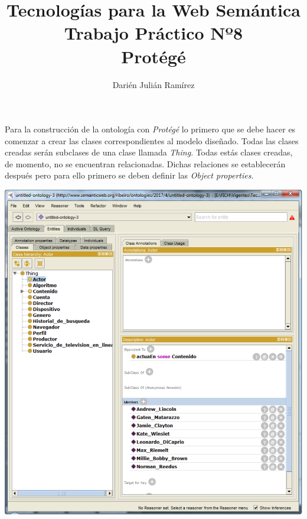 \documentclass[a4paper,10pt,spanish,oneside]{article}
\title{\Huge\usefont{T1}{}{}{n} Tecnologías para la Web Semántica\\
									 Trabajo Práctico Nº8\\
									 Protégé}
\author{Darién Julián Ramírez}
\date{}
\begin{document}
\maketitle %

\begin{minipage}{0.3\linewidth}

Para la construcción de la ontología con \textit{Protégé} lo primero que se debe hacer es comenzar a crear las clases correspondientes al modelo diseñado. Todas las clases creadas serán subclases de una clase llamada \textit{Thing}. Todas estás clases creadas, de momento, no se encuentran relacionadas. Dichas relaciones se establecerán después pero para ello primero se deben definir las \textit{Object properties}.

\end{minipage} \hfill \begin{minipage}{0.65\linewidth}

\begin{center}
\includegraphics[width=\linewidth]{1}
\end{center}

\end{minipage}
\end{document}

